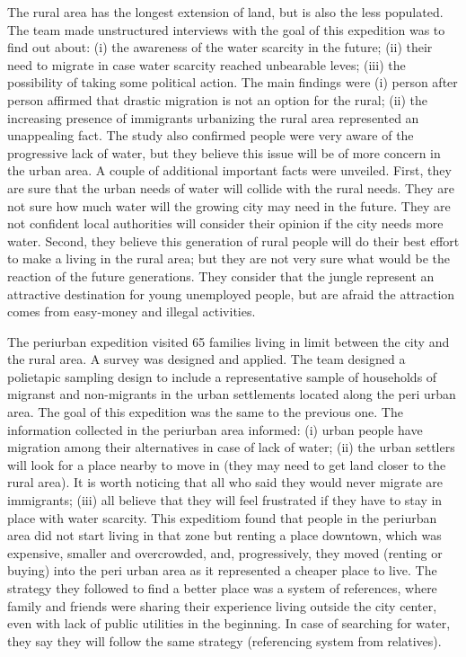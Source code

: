 \documentclass[doc,12pt,floatsintext]{apa7}
\begin{document}
The rural area has  the longest extension of land, but is also the less populated. The team made unstructured interviews with the goal of this expedition was to find out about: (i) the awareness of the water scarcity in the future; (ii) their need to migrate in case water scarcity reached unbearable leves; (iii) the possibility of taking some political action. The main findings were (i) person after person affirmed that drastic migration is not an option for the rural; (ii) the increasing presence of immigrants urbanizing the rural area represented an unappealing fact. The study also confirmed people were very aware of the progressive lack of water, but they believe this issue will be of more concern in the urban area. A couple of additional important facts were unveiled. First, they are sure that the urban needs of water will collide with the rural needs. They are not sure how much water will the growing city may need in the future. They are not confident local authorities will consider their opinion if the city needs more water. Second, they believe this generation of rural people will do their best effort to make a living in the rural area; but they are not very sure what would be the reaction of the future generations. They consider that the jungle represent an attractive destination for young unemployed people, but are afraid the attraction comes from easy-money and illegal activities.

The periurban expedition visited 65 families living in limit between the city and the rural area. A survey was designed and applied. The team designed a polietapic sampling design to include a representative sample of households of migranst and non-migrants in the urban settlements located along the peri urban area. The goal of this expedition was the same to the previous one. The information collected in the periurban area informed: (i) urban people have migration among their alternatives in case of lack of water; (ii) the urban settlers will look for a place nearby  to move in (they may need to get land closer to the rural area). It is worth noticing that all who said they would never migrate are immigrants; (iii) all  believe that they will feel frustrated if they have to stay in place with water scarcity. This expeditiom found that people in the periurban area did not start living in that zone but renting a place downtown, which was expensive, smaller and overcrowded, and, progressively, they moved (renting or buying) into the peri urban area as it represented a cheaper place to live. The strategy they followed to find a better place was a system of references, where family and friends were sharing their experience living outside the city center, even with lack of public utilities in the beginning. In case of searching for water, they say they will follow the same strategy (referencing system from relatives).
\end{document}
